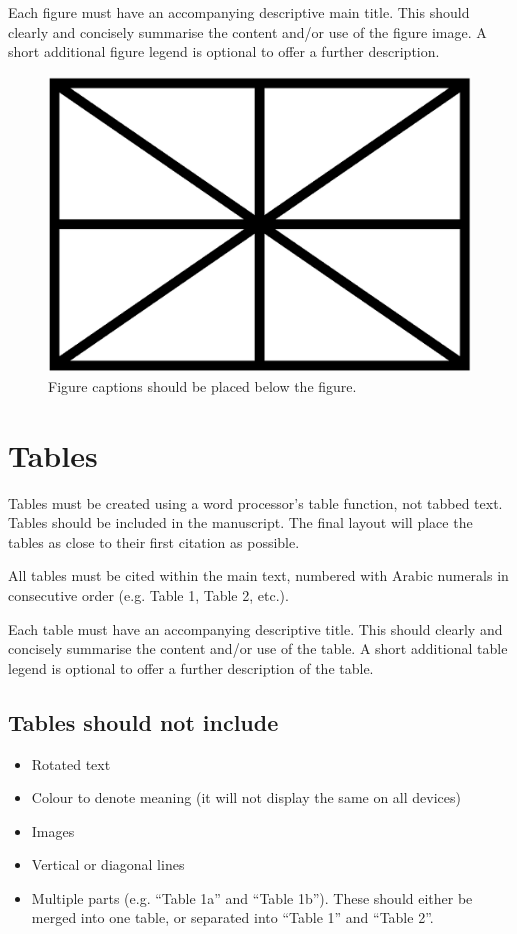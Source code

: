 \documentclass{article}
\begin{document}
Each figure must have an accompanying descriptive main title.
This should clearly and concisely summarise the content and/or
use of the figure image.
A short additional figure legend is optional to offer a further description.

\begin{figure}[htbp]
  \centering
  \includegraphics[width=0.9\columnwidth]{figure}
  \caption{Figure captions should be placed below the figure.}
\label{fig:figure}
\end{figure}

\section{Tables}\label{sec:tables}

Tables must be created using a word processor's table function,
not tabbed text.
Tables should be included in the manuscript.
The final layout will place the tables as close to their first
citation as possible.

All tables must be cited within the main text, numbered with Arabic
numerals in consecutive order (e.g. Table 1, Table 2, etc.).

Each table must have an accompanying descriptive title.
This should clearly and concisely summarise the content and/or
use of the table.
A short additional table legend is optional to offer a further
description of the table.

\subsection{Tables should not include}

\begin{itemize}
  \item Rotated text
  \item Colour to denote meaning (it will not display the same on all devices)
  \item Images
  \item Vertical or diagonal lines
  \item Multiple parts (e.g. ``Table 1a'' and ``Table 1b'').
  These should either be merged into one table,
  or separated into ``Table 1'' and ``Table 2''.
\end{itemize}
\end{document}
